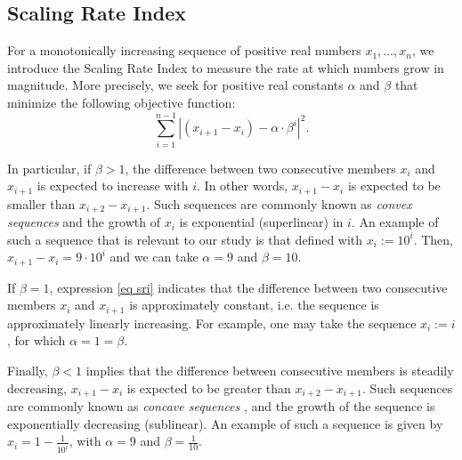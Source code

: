 \subsection{Scaling Rate Index}

For a monotonically increasing sequence of positive real numbers $x_1,\dots, x_n$, we introduce the Scaling Rate Index to measure the rate at which numbers grow in magnitude. More precisely, we seek for positive real constants $\alpha$ and $\beta$ that minimize the following objective function:
\begin{equation}\label{eq sri}
    \sum_{i=1}^{n-1}|(x_{i+1}-x_i) - \alpha\cdot \beta^i|^2.
\end{equation}


In particular, if $\beta>1$, the difference between two consecutive members $x_i$ and $x_{i+1}$ is expected to increase with $i$. In other words, $x_{i+1}-x_{i}$ is expected to be smaller than $x_{i+2}-x_{i+1}$. Such sequences are commonly known as \textit{convex sequences} \cite{rockafellar2015convex} and the growth of $x_i$ is exponential (superlinear) in $i$. An example of such a sequence that is relevant to our study is that defined with $x_i:=10^i$. Then, $x_{i+1}-x_i= 9\cdot 10^{i}$ and we can take $\alpha=9$ and $\beta = 10$. 

If $\beta=1$, expression \eqref{eq sri} indicates that the difference between two consecutive members $x_i$ and $x_{i+1}$ is approximately constant, i.e. the sequence is approximately linearly increasing. For example, one may take the sequence $x_i:=i$, for which $\alpha=1=\beta$.

Finally, $\beta<1$ implies that the difference between consecutive members is steadily decreasing, $x_{i+1}-x_{i}$ is expected to be greater than $x_{i+2}-x_{i+1}$. Such sequences are commonly known as \textit{concave sequences} \cite{rockafellar2015convex}, and the growth of the sequence is exponentially decreasing (sublinear). An example of such a sequence is given by $x_i = 1- \frac{1}{10^i}$, with $\alpha = 9$ and $\beta = \frac{1}{10}$. 


